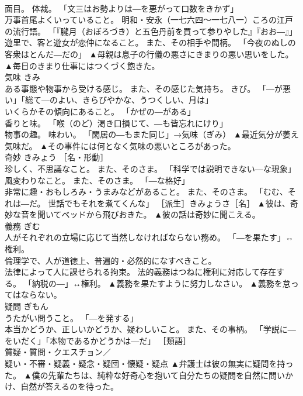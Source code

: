 \documentclass[8pt]{extreport}
\begin{document}
\begin{CJK}{UTF8}{min}
\\	面目。 体裁。 「文三はお勢よりは―を悪がって口数をきかず」 
\\	万事首尾よくいっていること。 明和・安永（一七六四〜一七八一）ころの江戸の流行語。 「『朧月（おぼろづき）と五色丹前を買って参りやした』『おお―』」 
\\	遊里で、客と遊女が恋仲になること。 また、その相手や間柄。 「今夜のぬしの客衆はとんだ―だの」	▲母親は息子の行儀の悪さにきまりの悪い思いをした。 ▲毎日のきまり仕事にはつくづく飽きた。
\\	気味	きみ	
\\	ある事態や物事から受ける感じ。 また、その感じた気持ち。 きび。 「―が悪い」「総て―のよい、きらびやかな、うつくしい、月は」 
\\	いくらかその傾向にあること。 「かぜの―がある」 
\\	香りと味。 「喉（のど）渇き口損じて、―も皆忘れにけり」 
\\	物事の趣。 味わい。 「閑居の―もまた同じ」→気味（ぎみ）	▲最近気分が萎え気味だ。 ▲その事件には何となく気味の悪いところがあった。
\\	奇妙	きみょう	［名・形動］ 
\\	珍しく、不思議なこと。 また、そのさま。 「科学では説明できない―な現象」 
\\	風変わりなこと。 また、そのさま。 「―な格好」 
\\	非常に趣・おもしろみ・うまみなどがあること。 また、そのさま。 「むむ、それは―だ。 世話でもそれを煮てくんな」 ［派生］きみょうさ［名］	▲彼は、奇妙な音を聞いてベッドから飛びおきた。 ▲彼の話は奇妙に聞こえる。
\\	義務	ぎむ	
\\	人がそれぞれの立場に応じて当然しなければならない務め。 「―を果たす」↔権利。 
\\	倫理学で、人が道徳上、普遍的・必然的になすべきこと。 
\\	法律によって人に課せられる拘束。 法的義務はつねに権利に対応して存在する。 「納税の―」↔権利。	▲義務を果たすように努力しなさい。 ▲義務を怠ってはならない。
\\	疑問	ぎもん	
\\	うたがい問うこと。 「―を発する」 
\\	本当かどうか、正しいかどうか、疑わしいこと。 また、その事柄。 「学説に―をいだく」「本物であるかどうかは―だ」 ［類語］
\\	質疑・質問・クエスチョン／
\\	疑い・不審・疑義・疑念・疑団・懐疑・疑点	▲弁護士は彼の無実に疑問を持った。 ▲僕の先輩たちは、純粋な好奇心を抱いて自分たちの疑問を自然に問いかけ、自然が答えるのを待った。

\end{CJK}
\end{document}
